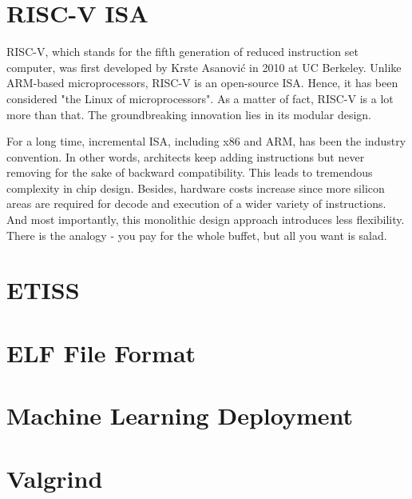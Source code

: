 \section{RISC-V ISA}

RISC-V, which stands for the fifth generation of reduced instruction set computer, was first developed by Krste Asanović in 2010 at UC Berkeley.
Unlike ARM-based microprocessors, RISC-V is an open-source ISA. Hence, it has been considered "the Linux of microprocessors".
As a matter of fact, RISC-V is a lot more than that. The groundbreaking innovation lies in its modular design.

\noindent For a long time, incremental ISA, including x86 and ARM, has been the industry convention. In other words, architects keep adding instructions but never removing for the sake of backward compatibility.  
This leads to tremendous complexity in chip design. Besides, hardware costs increase since more silicon areas are required for decode and execution of a wider variety of instructions. And most importantly,
this monolithic design approach introduces less flexibility. There is the analogy - you pay for the whole buffet, but all you want is salad.   

\section{ETISS}
\section{ELF File Format}
\section{Machine Learning Deployment}
\section{Valgrind}